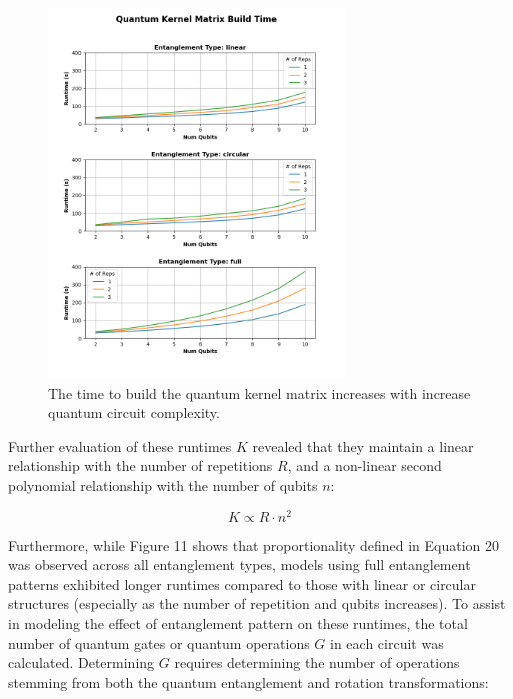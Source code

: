 \documentclass[11pt, oneside]{article}   	%
\begin{document}
\begin{figure}[h!]
    \centering
    \includegraphics[width=0.7\textwidth]{figures/fig_11.png}
    \captionsetup{font=small} 
    \caption{The time to build the quantum kernel matrix increases with increase quantum circuit complexity.}
    \label{fig11}
\end{figure}

Further evaluation of these runtimes $K$ revealed that they maintain a linear relationship with the number of repetitions $R$, and a non-linear second polynomial relationship with the number of qubits $n$:

\begin{equation}
	K \propto R \cdot n^2
\end{equation}

Furthermore, while Figure 11 shows that proportionality defined in Equation 20 was observed across all entanglement types, models using full entanglement patterns exhibited longer runtimes compared to those with linear or circular structures (especially as the number of repetition and qubits increases). To assist in modeling the effect of entanglement pattern on these runtimes, the total number of quantum gates or quantum operations $G$ in each circuit was calculated. Determining $G$ requires determining the number of operations stemming from both the quantum entanglement and rotation transformations:
\end{document}
